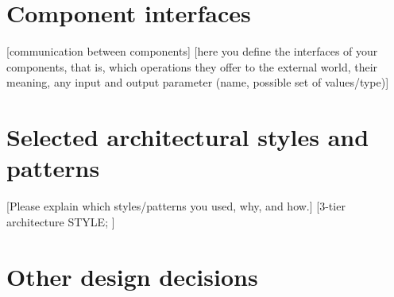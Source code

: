 \clearpage%
\section{Component interfaces}\label{sec:componentInterfaces}
[communication between components]
[here you define the interfaces of your components, that is, which operations they offer to the external world, their meaning, any input and output parameter (name, possible set of values/type)]














\clearpage%
\section{Selected architectural styles and patterns}\label{sec:styles}
[Please explain which styles/patterns you used, why, and how.]
[3-tier architecture STYLE; ]















\clearpage%
\section{Other design decisions}\label{sec:decisions}
\lipsum[8]

